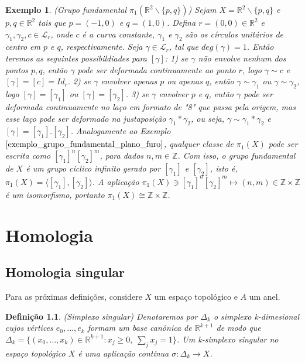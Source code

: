 \documentclass[12pt]{book}
\newtheorem{definicao}[teorema]{Definição}
\newtheorem{exemplo}[teorema]{Exemplo}
\newcommand{\caminhos}{\mathcal{L}}
\newcommand{\caminhospontobase}[1]{\caminhos_{#1}}
\newcommand{\classe}[1]{[#1]}
\newcommand{\gerador}[1]{\langle #1\rangle}
\newcommand{\grupofundamental}[1]{\pi_{1}(#1)}
\newcommand{\inteiros}{\mathbb{Z}}
\newcommand{\real}[1]{\mathbb{R}^{#1}}
\begin{document}
	\begin{exemplo}
		(Grupo fundamental $\grupofundamental{\real{2}\backslash\{p,q\}}$) Sejam $X = \real{2}\backslash\{p,q\}$ e $p ,q \in \real{2}$ tais que $p = (-1,0)$ e $q=(1,0)$. Defina $r=(0,0)\in \real{2}$ e $\gamma_{1}, \gamma_{2}, c \in \caminhospontobase{r}$, onde $c$ é a curva constante, $\gamma_{1}$ e $\gamma_{2}$ são os círculos unitários de centro em $p$ e $q$, respectivamente. Seja $\gamma \in \caminhospontobase{r}$, tal que $deg(\gamma) = 1$. Então teremos as seguintes possibildiades para $\classe{\gamma}$: 1) se $\gamma$ não envolve nenhum dos pontos $p,q$, então $\gamma$ pode ser deformada continuamente ao ponto $r$, logo $\gamma \sim c$ e $\classe{\gamma} =\classe{c}= Id_{r}$. 2) se $\gamma$ envolver apenas $p$ ou apenas $q$, então $\gamma \sim \gamma_{1}$ ou $\gamma \sim \gamma_{2}$, logo $\classe{\gamma }=\classe{\gamma_{1}}$ ou $\classe{\gamma }=\classe{\gamma_{2}}$. 3) se $\gamma$ envolver $p$ e $q$, então $\gamma$ pode ser deformada continuamente no laço em formato de "8" que passa pela origem, mas esse laço pode ser deformado na justaposição $\gamma_{1}*\gamma_{2}$, ou seja, $\gamma \sim \gamma_{1}*\gamma_{2}$ e $\classe{\gamma} = \classe{\gamma_{1}}.\classe{\gamma_{2}}$. Analogamente ao Exemplo $\ref{exemplo_grupo_fundamental_plano_furo}$, qualquer classe de $\grupofundamental{X}$ pode ser escrita como $\classe{\gamma_{1}}^{n} \classe{\gamma_{2}}^{m}$, para dados $n,m \in \inteiros$. Com isso, o grupo fundamental de $X$ é um grupo cíclico infinito gerado por $\classe{\gamma_{1}}$ e $\classe{\gamma_{2}}$, isto é, $\grupofundamental{X} = \gerador{\classe{\gamma_{1}}, \classe{\gamma_{2}}}$. A aplicação $\grupofundamental{X} \ni \classe{\gamma_{1}}^{n} \classe{\gamma_{2}}^{m} \mapsto (n,m) \in \inteiros\times\inteiros$ é um isomorfismo, portanto $\grupofundamental{X}  \cong \inteiros\times\inteiros$.
	\end{exemplo}
		
	\chapter{Homologia}
	
	\section{Homologia singular}
	Para as próximas definições, considere $X$ um espaço topológico e $A$ um anel.
	\begin{definicao}
		(Simplexo singular) Denotaremos por $\Delta_{k}$ o simplexo k-dimesional cujos vértices $e_{0}, \dots, e_{k}$ formam um base canônica de $\real{k+1}$ de modo que $\Delta_{k} = \{(x_{0}, \dots, x_{k}) \in \real{k+1}: x_{j}\geq 0, \;\sum_{j}x_{j}=1\}$. Um k-simplexo singular no espaço topológico $X$ é uma aplicação contínua $\sigma:\Delta_{k} \to X$.
	\end{definicao}
	
\end{document}
